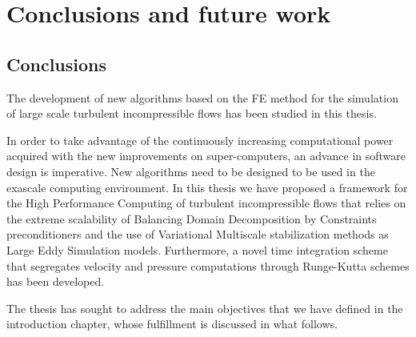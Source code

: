 \chapter{Conclusions and future work}
\label{chap-conclusions}

\section{Conclusions}
\label{sec-C9_conclusions}
The development of new algorithms based on the FE method for the simulation of large scale turbulent incompressible flows has been studied in this thesis.

In order to take advantage of the continuously increasing computational power acquired with the new improvements on super-computers, an advance in software design is imperative. New algorithms need to be designed to be used in the exascale computing environment. In this thesis we have proposed a framework for the High Performance Computing of turbulent incompressible flows that relies on the extreme scalability of Balancing Domain Decomposition by Constraints preconditioners and the use of Variational Multiscale stabilization methods as Large Eddy Simulation models. Furthermore, a novel time integration scheme that segregates velocity and pressure computations through Runge-Kutta schemes has been developed.

The thesis has sought to address the main objectives that we have defined in the introduction chapter, whose fulfillment is discussed in what follows.

